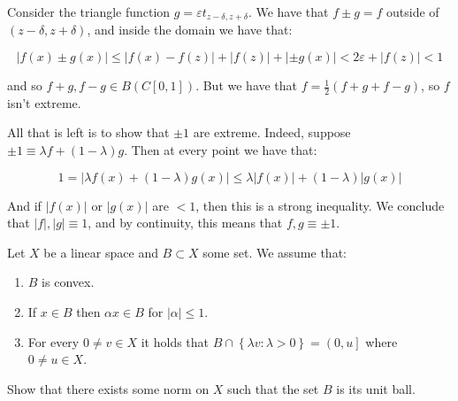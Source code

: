 \documentclass[11pt]{article} %
\begin{document}
\begin{Answer}
\begin{enumerate}
\begin{item}
Consider the triangle function $g = \varepsilon t_{z - \delta, z + \delta}$. We have that $f \pm g = f$ outside of $\left(z -\delta, z + \delta\right)$, and inside the domain we have that:

\[ \left|f\left(x\right) \pm g\left(x\right)\right| \leq \left| f\left(x\right) - f\left(z\right) \right| + \left| f\left(z\right)\right| + \left| \pm g\left(x\right) \right| < 2\varepsilon + \left|f\left(z\right)\right| < 1\]

and so $f+g, f-g \in B\left(C\left[0, 1\right]\right)$. But we have that $f = \frac{1}{2}\left(f+g + f - g\right)$, so $f$ isn't extreme.

All that is left is to show that $\pm1$ are extreme. Indeed, suppose $\pm1 \equiv \lambda f + \left( 1 - \lambda\right)g$. Then at every point we have that:

\[ 1 = \left|\lambda f\left(x\right)  + \left(1 - \lambda\right)g\left(x\right)\right| \leq \lambda \left| f\left(x\right) \right| + \left(1 - \lambda\right) \left|g\left(x\right)\right| \] 

And if $\left|f\left(x\right)\right|$ or $\left|g\left(x \right)\right|$ are $< 1$, then this is a strong inequality. We conclude that $\left|f\right|, \left|g\right| \equiv 1$, and by continuity, this means that $f,g \equiv \pm1$.
\end{item}
\end{enumerate}
\end{Answer}

\begin{Exercise}
Let $X$ be a linear space and $B \subset X$ some set. We assume that:
\begin{enumerate}
\item $B$ is convex.
\item If $x\in B$ then $\alpha x\in B$ for $\left|\alpha\right|\leq1$.
\item For every $0\neq v\in X$ it holds that $B\cap\left\{\lambda v :\lambda >0\right\}= \left(0,u\right]$ where $0\neq u\in X$.
\end{enumerate}
Show that there exists some norm on $X$ such that the set $B$ is its unit ball.
\end{Exercise}
\end{document}

